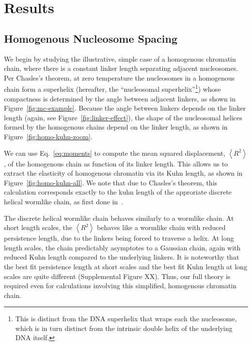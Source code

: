 \documentclass[%
 reprint,
superscriptaddress,
showpacs,preprintnumbers,
 amsmath,amssymb,
 aps,
 prl,
]{revtex4-1}
\newcommand{\RR}{\left\langle{}R^2\right\rangle{}}
\begin{document}
\section{\label{sec:model}Results}
\subsection{\label{sec:homo-kuhn}Homogenous Nucleosome Spacing}

We begin by studying the illustrative, simple case of a homogenous chromatin
    chain, where there is a constant linker length separating adjacent
    nucleosomes.
Per Chasles's theorem, at zero temperature the nucleosomes in a homogenous chain
    form a superhelix (hereafter, the ``nucleosomal superhelix''\footnote{%
        This is distinct from the DNA superhelix that wraps each the nucleosome,
        which is in turn distinct from the intrinsic double helix of the
        underlying DNA itself.})
    whose compactness is determined by the angle between adjacent linkers, as
    shown in Figure~\ref{fig:mc-example}.
Because the angle between linkers depends on the linker length (again, see
    Figure~\ref{fig:linker-effect}), the shape of the nucleosomal helices formed by
    the homogenous chains depend on the linker length, as shown in
    Figure~\ref{fig:homo-kuhn-zoom}.

We can use Eq.~\ref{eq:moments} to compute the mean squared displacement, $\RR$,
    of the homogenous chain as function of its linker length.
This allows us to extract the elasticity of homogenous chromatin via its Kuhn
    length, as shown in Figure~\ref{fig:homo-kuhn-all}.
We note that due to Chasles's theorem, this calculation corresponds exactly to
    the kuhn length of the approriate discrete helical wormlike chain, as first
    done in~\cite{yamakawa1976}.

The discrete helical wormlike chain behaves similarly to a wormlike chain.
At short length scales, the $\RR$ behaves like a wormlike chain with reduced
    persistence length, due to the linkers being forced to traverse a helix.
At long length scales, the chain predictably asymptotes to a Gaussian
    chain, again with reduced Kuhn length compared to the underlying linkers.
It is noteworthy that the best fit persistence length at short scales and the
    best fit Kuhn length at long scales are quite different (Supplemental Figure
    XX).
Thus, our full theory is required even for calculations involving this
    simplified, homogenous chromatin chain.
\end{document}
